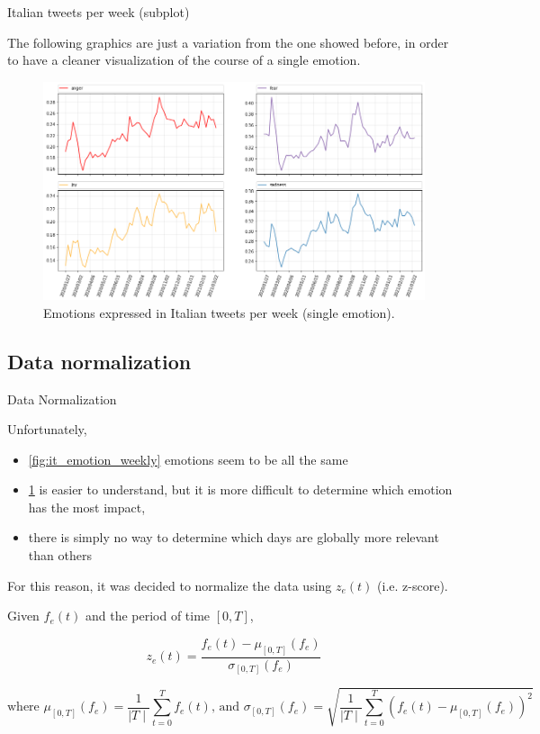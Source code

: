 \documentclass[8pt]{beamer}  %
\begin{document}
\begin{frame}{Italian tweets per week (subplot)}
	
	The following graphics are just a variation from the one showed before, in order to have a cleaner visualization of the course of a single emotion. 
	
	\begin{figure}[h]
    	\includegraphics[scale=.3]{assets/img/it_emotions_subplots.png}
    	\caption{Emotions expressed in Italian tweets per week (single emotion).}
    	\label{fig:it_emotion_weekly_subplot}
    \end{figure}

\end{frame}

\subsection{Data normalization}
\begin{frame}{Data Normalization}

    Unfortunately,

    \begin{itemize}
        \item \cref{fig:it_emotion_weekly} emotions seem to be all the same
        \item \cref{fig:it_emotion_weekly_subplot} is easier to understand, but it is more difficult to determine which emotion has the most impact,
        \item there is simply no way to determine which days are globally more relevant than others
    \end{itemize}
	
	For this reason, it was decided to normalize the data using \(z_e(t)\) (i.e. z-score).
	
	\begin{definition}
	    Given \(f_e(t)\) and the period of time \([0,T]\),
	    
	    \[z_e(t) = \frac{f_e(t) - \mu_{[0,T]}(f_e)}{\sigma_{[0,T]}(f_e)}\]
	    
	    \[\text{where } \mu_{[0,T]}(f_e) = \frac{1}{\mid T \mid} \sum_{t =0}^{T} f_e(t) \text{, and } \sigma_{[0,T]}(f_e) = \sqrt{\frac{1}{\mid T \mid} \sum_{t = 0}^{T} \left( f_e(t) - \mu_{[0,T]}(f_e) \right)^2 }\] 
	\end{definition}

\end{frame}
\end{document}

